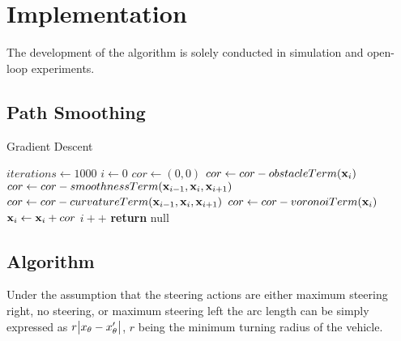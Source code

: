 \chapter{Implementation}
The development of the algorithm is solely conducted in simulation and open-loop experiments.

\section{Path Smoothing}
\begin{algorithm}
    \caption{Gradient Descent}\label{alg:gradientDescent}
    \begin{algorithmic}[1]
    \State $iterations \gets 1000$
    \State $i \gets 0$
        	\ForAll {$\bldx \in \calP$}
        		\State $cor \gets  (0,0)$
        		\State $cor \gets  cor - obstacleTerm(\mathbf{x}_{i})$
        		\State $cor \gets  cor - smoothnessTerm(\mathbf{x}_{i-1},\mathbf{x}_{i},\mathbf{x}_{i+1})$
        		\State $cor \gets  cor - curvatureTerm(\mathbf{x}_{i-1},\mathbf{x}_{i},\mathbf{x}_{i+1})$
        		\State $cor \gets  cor - voronoiTerm(\mathbf{x}_{i})$
        		\State $\mathbf{x}_{i} \gets \mathbf{x}_{i} + cor$
        	\EndFor
        \State $i++$
        \EndWhile
        \State \textbf{return} null
    \end{algorithmic}
\end{algorithm}

\section{Algorithm}

Under the assumption that the steering actions are either maximum steering right, no steering, or maximum steering left the arc length can be simply expressed as $r\abs{x_\theta- x'_\theta}$, $r$ being the minimum turning radius of the vehicle. 

